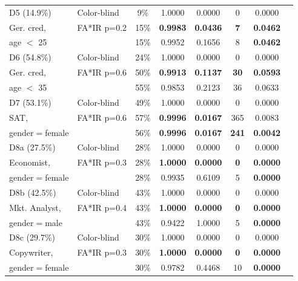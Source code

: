 \begin{table}[t]
{\begin{tabular}{llcccccc}
			D5 (14.9\%) & Color-blind & 9\% & 1.0000 & 0.0000 & 0 & 0.0000 \\
			Ger. cred,& FA*IR p=0.2 & 15\% & \textbf{0.9983} & \textbf{0.0436} & \textbf{7} & \textbf{0.0462} \\
			age $<$ 25 & \citeauthor{Feldman2015} & 15\% & 0.9952 & 0.1656 & 8 & \textbf{0.0462} \\ \midrule
			
			D6 (54.8\%) & Color-blind & 24\% & 1.0000 & 0.0000 & 0 & 0.0000 \\
			Ger. cred, & FA*IR p=0.6 & 50\% & \textbf{0.9913} & \textbf{0.1137} & \textbf{30} & \textbf{0.0593} \\
			age $<$ 35 & \citeauthor{Feldman2015} & 55\% & 0.9853 & 0.2123 & 36 & 0.0633 \\ \midrule
			
			D7 (53.1\%) & Color-blind    & 49\% & 1.0000 & 0.0000 & 0 & 0.0000 \\
			SAT, 	    & FA*IR p=0.6    & 57\% & \textbf{0.9996} & \textbf{0.0167} & 365 & 0.0083 \\ 
			gender$=$female & \citeauthor{Feldman2015} & 56\% & \textbf{0.9996} & \textbf{0.0167} & \textbf{241} & \textbf{0.0042} \\ \midrule
			
			D8a (27.5\%)  & Color-blind    & 28\% & 1.0000 		& 0.0000 	& 0  & 0.0000 \\
			Economist,     & FA*IR p=0.3    & 28\% & \textbf{1.0000} & \textbf{0.0000} & \textbf{0}  & \textbf{0.0000} \\
			gender$=$female & \citeauthor{Feldman2015} & 28\% & 0.9935 		& 0.6109 	& 5 & \textbf{0.0000} \\ \midrule
			D8b (42.5\%)  & Color-blind    & 43\% & 1.0000 		& 0.0000 	& 0           & 0.0000 \\
			Mkt. Analyst,  & FA*IR p=0.4    & 43\% & \textbf{1.0000} & \textbf{0.0000} & \textbf{0}  & \textbf{0.0000} \\
			gender$=$male & \citeauthor{Feldman2015} & 43\% & 0.9422 		& 1.0000 	& 5 & \textbf{0.0000} \\ \midrule
			D8c (29.7\%)  & Color-blind    & 30\% & 1.0000 		& 0.0000 	& 0           & 0.0000 \\
			Copywriter,    & FA*IR p=0.3    & 30\% & \textbf{1.0000} & \textbf{0.0000} & \textbf{0}  & \textbf{0.0000} \\
			gender$=$female & \citeauthor{Feldman2015} & 30\% & 0.9782 & 0.4468 & 10 & \textbf{0.0000} \\
			\bottomrule
		\end{tabular}
	}
	\vspace{-3mm}
\end{table}

